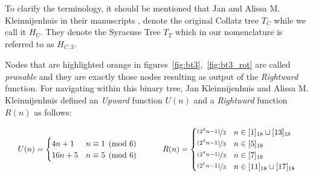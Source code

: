\begin{remark}
	To clarify the terminology, it should be mentioned that Jan and Alissa M. Kleinnijenhuis in their manuscripts \cite{Ref_Kleinnijenhuis_2020a}, \cite{Ref_Kleinnijenhuis_2020b} denote the original Collatz tree $T_C$ while we call it $H_U$. They denote the Syracuse Tree $T_T$ which in our nomenclature is referred to as $H_{C,3}$.
\end{remark}

Nodes that are highlighted orange in figures~\ref{fig:bt3},~\ref{fig:bt3_rot} are called \textit{prunable} and they are exactly those nodes resulting as output of the \textit{Rightward} function. For navigating within this binary tree, Jan Kleinnijenhuis and Alissa M. Kleinnijenhuis \cite{Ref_Kleinnijenhuis_2020a} defined an \textit{Upward} function $U(n)$ and a \textit{Rightward} function $R(n)$ as follows:

\begin{equation}
\label{eq:bintree_3_rightward_upward}
\setlength{\arraycolsep}{1.6em}
\begin{array}{cc}
U(n)=\begin{cases}
        4n+1	&	n\equiv 1\pmod 6\\
        16n+5	&	n\equiv 5\pmod 6
    \end{cases} &
R(n)=\begin{cases}
    \nicefrac{(2^2n-1)}{3}	&	n\in[1]_{18}\cup[13]_{18}\\
    \nicefrac{(2^3n-1)}{3}	&	n\in[5]_{18}\\
    \nicefrac{(2^4n-1)}{3}	&	n\in[7]_{18}\\
    \nicefrac{(2^1n-1)}{3}	&	n\in[11]_{18}\cup[17]_{18}
\end{cases}
\end{array}
\end{equation}

